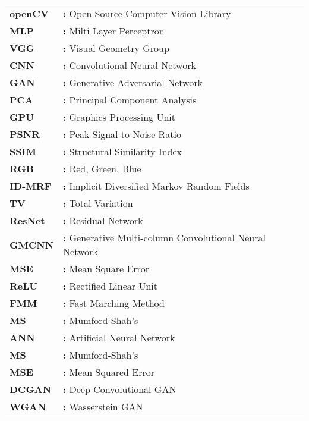 \hspace{-3mm}

\begin{tabular}{ p{2cm} l }
    {\bf{openCV}} & {\bf:} Open Source Computer Vision Library\\
    {\bf{MLP}} & {\bf:} Milti Layer Perceptron\\
    {\bf{VGG}} & {\bf:} Visual Geometry Group\\
    {\bf{CNN}} & {\bf:} Convolutional Neural Network\\
    {\bf{GAN}} & {\bf:} Generative Adversarial Network\\
    {\bf{PCA}} & {\bf:} Principal Component Analysis\\
    {\bf{GPU}} & {\bf:} Graphics Processing Unit\\
    {\bf{PSNR}} & {\bf:} Peak Signal-to-Noise Ratio\\
    {\bf{SSIM}} & {\bf:} Structural Similarity Index\\
    {\bf{RGB}} & {\bf:} Red, Green, Blue\\
    {\bf{ID-MRF}} & {\bf:} Implicit Diversified Markov Random Fields\\
    {\bf{TV}} & {\bf:} Total Variation\\
    {\bf{ResNet}} & {\bf:} Residual Network\\
    {\bf{GMCNN}} & {\bf:} Generative Multi-column Convolutional Neural Network\\
    {\bf{MSE}} & {\bf:} Mean Square Error\\
    {\bf{ReLU}} & {\bf:} Rectified Linear Unit\\
    {\bf{FMM}} & {\bf:} Fast Marching Method\\
    {\bf{MS}} & {\bf:} Mumford-Shah's\\
    {\bf{ANN}} & {\bf:} Artificial Neural Network\\
    {\bf{MS}} & {\bf:} Mumford-Shah's\\
    {\bf{MSE}} & {\bf:} Mean Squared Error\\
    {\bf{DCGAN}} & {\bf:} Deep Convolutional GAN\\
    {\bf{WGAN}} & {\bf:} Wasserstein GAN\\
\end{tabular}

